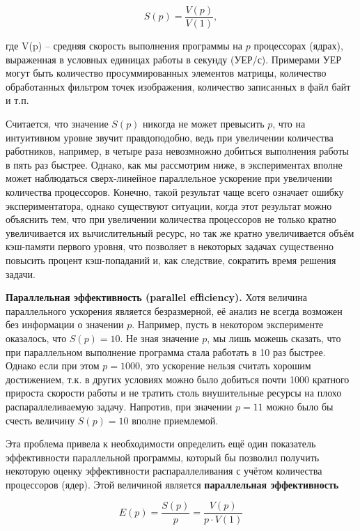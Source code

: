 \begin{equation}
    \label{parallelAcceleration:equation}
    S(p) = \frac{V(p)}{V(1)},
\end{equation}

где V(p) – средняя скорость выполнения программы на $p$ процессорах (ядрах), выраженная в условных единицах работы в секунду (УЕР/с). Примерами УЕР могут быть количество просуммированных элементов матрицы, количество обработанных фильтром точек изображения, количество записанных в файл байт и т.п.

Считается, что значение $S(p)$ никогда не может превысить $p$, что на интуитивном уровне звучит правдоподобно, ведь при увеличении количества работников, например, в четыре раза невозмножно добиться выполнения работы в пять раз быстрее.  Однако, как мы рассмотрим ниже, в экспериментах вполне может наблюдаться сверх-линейное параллельное ускорение при увеличении количества процессоров. Конечно, такой результат чаще всего означает ошибку экспериментатора, однако существуют ситуации, когда этот результат можно объяснить тем, что при увеличении количества процессоров не только кратно увеличивается их вычислительный ресурс, но так же кратно увеличивается объём кэш-памяти первого уровня, что позволяет в некоторых задачах существенно повысить процент кэш-попаданий и, как следствие, сократить время решения задачи.

\textbf{Параллельная эффективность (parallel efficiency).} Хотя величина параллельного ускорения является безразмерной, её анализ не всегда возможен без информации о значении $p$. Например, пусть в некотором эксперименте оказалось, что $S(p)=10$. Не зная значение $p$, мы лишь можешь сказать, что при параллельном выполнение программа стала работать в 10 раз быстрее. Однако если при этом $p=1000$, это ускорение нельзя считать хорошим достижением, т.к. в других условиях можно было добиться почти 1000 кратного прироста скорости работы и не тратить столь внушительные ресурсы на плохо распараллеливаемую задачу. Напротив, при значении $p=11$ можно было бы счесть  величину $S(p)=10$ вполне приемлемой.

Эта проблема привела к необходимости определить ещё один показатель эффективности параллельной программы, который бы позволил получить некоторую оценку эффективности распараллеливания с учётом  количества процессоров (ядер). Этой величиной является \textbf{параллельная эффективность}

\begin{equation}
    \label{parallelEffect:equation}
    E(p) = \frac{S(p)}{p} = \frac{V(p)}{p \cdot V(1)}
\end{equation}


